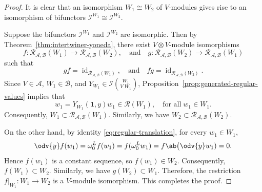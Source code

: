\documentclass[12pt, english]{article}
\numberwithin{equation}{section}
\DeclareMathOperator{\id}{id}
\theoremstyle{plain}
\theoremstyle{definition}
\theoremstyle{remark}
\begin{document}
	\begin{proof}
		
		It is clear that an isomorphism $W_1 \cong W_2$ of $V$-modules  gives rise to an isomorphism of bifunctors $\mathcal{I}^{W_1} \cong \mathcal{I}^{W_2} $.
		
		Suppose the bifunctors $\mathcal{I}^{W_1}$ and $\mathcal{I}^{W_2}$ are isomorphic. Then by Theorem~\ref{thm:intertwiner-yoneda}, there exist $V \otimes V$-module isomorphisms
		\[
		f \colon \mathcal{R}_{\mathcal{A}, \mathcal{B} }(W_1) \longrightarrow \mathcal{R}_{\mathcal{A}, \mathcal{B} }(W_2), \quad \text{and} \quad
		g \colon \mathcal{R}_{\mathcal{A}, \mathcal{B} }(W_2) \longrightarrow \mathcal{R}_{\mathcal{A}, \mathcal{B} }(W_1)
		\]
		such that
		\[
		gf = \id_{\mathcal{R}_{\mathcal{A}, \mathcal{B} }(W_1)}, \quad \text{and} \quad fg = \id_{ \mathcal{R}_{\mathcal{A}, \mathcal{B} }(W_2) }.
		\]
		Since $V \in \mathcal{A}$, $W_1 \in \mathcal{B}$, and $Y_{W_1} \in \mathcal{I} \binom{W_1}{V \; W_1}$,  Proposition~\ref{prop:generated-regular-values} implies that
		\[
		w_1 = Y_{W_1}(\mathbf{1}, y) w_1 \in \mathcal{R}(W_1), \quad \text{for all} \; w_1 \in W_1.
		\]
		Consequently, $W_1 \subset \mathcal{R}_{\mathcal{A}, \mathcal{B} }(W_1) $. Similarly, we have $W_2 \subset \mathcal{R}_{\mathcal{A}, \mathcal{B} }(W_2) $.
		
		On the other hand, by identity \eqref{eq:regular-translation}, for every $w_1 \in W_1$,
		\[
		\odv{y}f(w_1) = \omega^L_0f(w_1) = f(\omega^L_0 w_1) = f \ab\big(\odv{y} w_1) = 0.
		\]
		Hence $f(w_1)$  is a constant sequence, so $f(w_1) \in W_2$. Consequently, $f(W_1) \subset W_2$. Similarly, we have $g(W_2) \subset W_1$.
		Therefore, the restriction $f |_{W_1} \colon W_1 \to W_2$ is a $V$-module isomorphism. This completes the proof.
	\end{proof}
	
\end{document}

